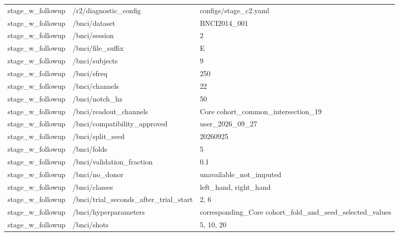\begin{longtable}{p{.65in}p{2.8in}p{3.2in}}
stage\_\allowbreak{}w\_\allowbreak{}followup & /r2/diagnostic\_\allowbreak{}config & configs/stage\_\allowbreak{}c2.yaml \\
stage\_\allowbreak{}w\_\allowbreak{}followup & /bnci/dataset & BNCI2014\_\allowbreak{}001 \\
stage\_\allowbreak{}w\_\allowbreak{}followup & /bnci/session & 2 \\
stage\_\allowbreak{}w\_\allowbreak{}followup & /bnci/file\_\allowbreak{}suffix & E \\
stage\_\allowbreak{}w\_\allowbreak{}followup & /bnci/subjects & 9 \\
stage\_\allowbreak{}w\_\allowbreak{}followup & /bnci/sfreq & 250 \\
stage\_\allowbreak{}w\_\allowbreak{}followup & /bnci/channels & 22 \\
stage\_\allowbreak{}w\_\allowbreak{}followup & /bnci/notch\_\allowbreak{}hz & 50 \\
stage\_\allowbreak{}w\_\allowbreak{}followup & /bnci/readout\_\allowbreak{}channels & Core cohort\_\allowbreak{}common\_\allowbreak{}intersection\_\allowbreak{}19 \\
stage\_\allowbreak{}w\_\allowbreak{}followup & /bnci/compatibility\_\allowbreak{}approved & user\_\allowbreak{}2026\_\allowbreak{}09\_\allowbreak{}27 \\
stage\_\allowbreak{}w\_\allowbreak{}followup & /bnci/split\_\allowbreak{}seed & 20260925 \\
stage\_\allowbreak{}w\_\allowbreak{}followup & /bnci/folds & 5 \\
stage\_\allowbreak{}w\_\allowbreak{}followup & /bnci/validation\_\allowbreak{}fraction & 0.1 \\
stage\_\allowbreak{}w\_\allowbreak{}followup & /bnci/no\_\allowbreak{}donor & unavailable\_\allowbreak{}not\_\allowbreak{}imputed \\
stage\_\allowbreak{}w\_\allowbreak{}followup & /bnci/classes & left\_\allowbreak{}hand, right\_\allowbreak{}hand \\
stage\_\allowbreak{}w\_\allowbreak{}followup & /bnci/trial\_\allowbreak{}seconds\_\allowbreak{}after\_\allowbreak{}trial\_\allowbreak{}start & 2, 6 \\
stage\_\allowbreak{}w\_\allowbreak{}followup & /bnci/hyperparameters & corresponding\_\allowbreak{}Core cohort\_\allowbreak{}fold\_\allowbreak{}and\_\allowbreak{}seed\_\allowbreak{}selected\_\allowbreak{}values \\
stage\_\allowbreak{}w\_\allowbreak{}followup & /bnci/shots & 5, 10, 20 \\

\end{longtable}
